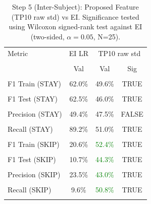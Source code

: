 \begin{table}[H]
\centering
\begin{tabular}{lccc}
\hline
Metric & EI LR & \multicolumn{2}{c}{TP10 raw std} \\\\
 & Val & Val & Sig \\\\
\hline
F1 Train (STAY) & 62.0\% & 49.6\% & TRUE \\\\
F1 Test (STAY) & 62.5\% & 46.0\% & TRUE \\\\
Precision (STAY) & 49.4\% & 47.5\% & FALSE \\\\
Recall (STAY) & 89.2\% & 51.0\% & TRUE \\\\
F1 Train (SKIP) & 20.6\% & \textcolor{green}{52.4\%} & TRUE \\\\
F1 Test (SKIP) & 10.7\% & \textcolor{green}{44.3\%} & TRUE \\\\
Precision (SKIP) & 23.5\% & \textcolor{green}{43.0\%} & TRUE \\\\
Recall (SKIP) & 9.6\% & \textcolor{green}{50.8\%} & TRUE \\\\
\hline
\end{tabular}
\caption{Step 5 (Inter-Subject): Proposed Feature (TP10 raw std) vs EI. Significance tested using Wilcoxon signed-rank test against EI (two-sided, $\alpha=0.05$, N=25).}
\label{tab:metrics_5_inter_3}
\end{table}